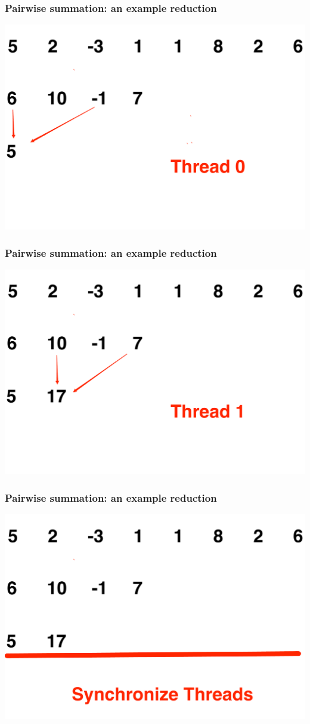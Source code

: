 \documentclass[handout]{beamer}
\numberwithin{equation}{section}
\begin{document}
\begin{frame}
\frametitle{Pairwise summation: an example reduction}
\includegraphics[scale=.25]{fig/psum6.pdf}
\end{frame}

\begin{frame}
\frametitle{Pairwise summation: an example reduction}
\includegraphics[scale=.25]{fig/psum7.pdf}
\end{frame}

\begin{frame}
\frametitle{Pairwise summation: an example reduction}
\includegraphics[scale=.25]{fig/psum8.pdf}
\end{frame}
\end{document}

